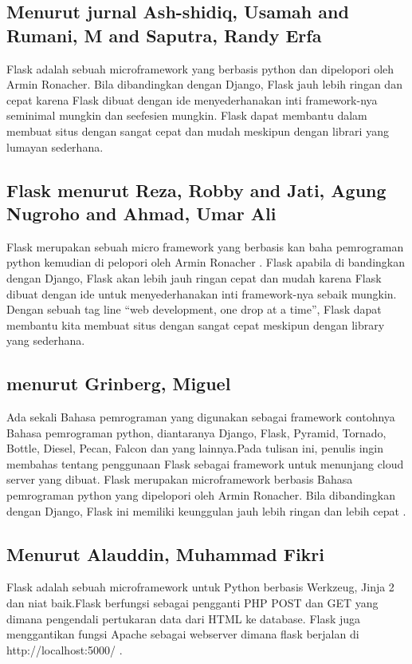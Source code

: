 \documentclass[12pt]{article}
\begin{document}
\subsection{Menurut jurnal Ash-shidiq, Usamah and Rumani, M and Saputra, Randy Erfa}
Flask adalah sebuah microframework yang berbasis python dan dipelopori oleh Armin Ronacher. Bila dibandingkan dengan Django, Flask jauh lebih ringan dan cepat karena Flask dibuat dengan ide menyederhanakan inti framework-nya seminimal mungkin dan seefesien mungkin. Flask dapat membantu dalam membuat situs dengan sangat cepat dan mudah meskipun dengan librari yang lumayan sederhana\cite{ash2017perancangan}.

\subsection{Flask menurut Reza, Robby and Jati, Agung Nugroho and Ahmad, Umar Ali}
Flask merupakan sebuah micro framework yang berbasis kan baha pemrograman python kemudian di pelopori oleh Armin Ronacher . Flask apabila  di bandingkan dengan Django, Flask akan lebih jauh ringan  cepat dan mudah  karena  Flask  dibuat   dengan  ide  untuk menyederhanakan  inti  framework-nya  sebaik  mungkin. Dengan sebuah tag line “web development, one drop at a time”, Flask dapat membantu kita membuat situs dengan sangat cepat meskipun dengan library yang sederhana\cite{reza2016perancangan}.

\subsection{menurut Grinberg, Miguel}
Ada sekali Bahasa pemrograman yang digunakan sebagai framework contohnya Bahasa pemrograman python, diantaranya Django, Flask, Pyramid, Tornado, Bottle, Diesel, Pecan, Falcon dan yang lainnya.Pada tulisan ini, penulis ingin membahas tentang penggunaan Flask sebagai framework untuk menunjang cloud server yang dibuat. Flask merupakan microframework berbasis Bahasa pemrograman python yang dipelopori oleh Armin Ronacher. Bila dibandingkan dengan Django, Flask ini memiliki keunggulan jauh lebih ringan dan lebih cepat \cite{grinberg2018flask}.

\subsection{Menurut Alauddin, Muhammad Fikri}
Flask adalah sebuah microframework untuk Python berbasis Werkzeug, Jinja 2 dan niat baik.Flask berfungsi sebagai pengganti PHP POST dan GET yang dimana pengendali pertukaran data dari HTML ke database. Flask juga menggantikan fungsi Apache sebagai webserver dimana flask berjalan di http://localhost:5000/ \cite{alauddin2017implementasi}.
\end{document}
